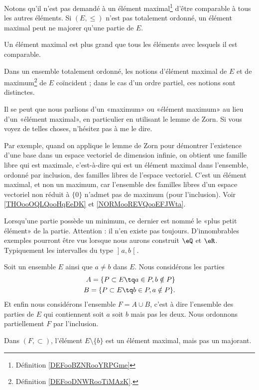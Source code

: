 \begin{normaltext}    \label{NORMooVHIBooJAOsou}
	Notons qu'il n'est pas demandé à un élément maximal\footnote{Définition \ref{DEFooBZNRooYRPGme}} d'être comparable à tous les autres éléments. Si \( (E,\leq)\) n'est pas totalement ordonné, un élément maximal peut ne majorer qu'une partie de \( E\).

	Un élément maximal est plus grand que tous les éléments avec lesquels il est comparable.

	Dans un ensemble totalement ordonné, les notions d'élément maximal de \( E\) et de maximum\footnote{Définition \ref{DEFooDNWRooTiMAzK}.} de \( E\) coïncident ; dans le cas d'un ordre partiel, ces notions sont distinctes.

	Il se peut que nous parlions d'un «maximum» ou «élément maximum»  au lieu d'un «élément maximal», en particulier en utilisant le lemme de Zorn. Si vous voyez de telles choses, n'hésitez pas à me le dire.

	Par exemple, quand on applique le lemme de Zorn pour démontrer l'existence d'une base dans un espace vectoriel de dimension infinie, on obtient une famille libre qui est maximale, c'est-à-dire qui est un élément maximal dans l'ensemble, ordonné par inclusion, des familles libres de l'espace vectoriel. C'est un élément maximal, et non un maximum, car l'ensemble des familles libres d'un espace vectoriel non réduit à \( \{ 0 \}\) n'admet pas de maximum (pour l'inclusion). Voir \ref{THOooOQLQooHqEeDK} et \ref{NORMooREVQooEFJWta}.
\end{normaltext}

Lorsqu'une partie possède un minimum, ce dernier est nommé le «plus petit élément» de la partie. Attention : il n'en existe pas toujours. D'innombrables exemples pourront être vus lorsque nous aurons construit \( \eQ\) et \( \eR\). Typiquement les intervalles du type \( \mathopen] a , b \mathclose[\).

\begin{example}
	Soit un ensemble \( E\) ainsi que \( a\neq b\) dans \( E\). Nous considérons les parties
	\begin{subequations}
		\begin{align}
			A=\{ P\subset E\tq a\in P,b\notin P \} \\
			B=\{ P\subset E\tq b\in P,a\notin P \}.
		\end{align}
	\end{subequations}
	Et enfin nous considérons l'ensemble \( F=A\cup B\), c'est à dire l'ensemble des parties de \( E\) qui contiennent soit \( a\) soit \( b\) mais pas les deux. Nous ordonnons partiellement \( F\) par l'inclusion.

	Dans \( (F,\subset)\), l'élément \( E\setminus\{ b \}\) est un élément maximal, mais pas un majorant.
\end{example}

